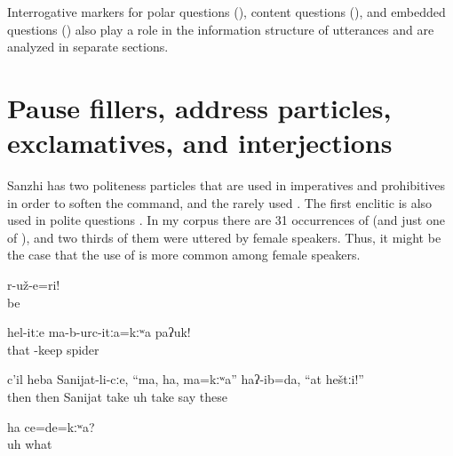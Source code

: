 Interrogative markers for polar questions (), content questions (), and embedded questions () also play a role in the information structure of utterances and are analyzed in separate sections.



\section{Pause fillers, address particles, exclamatives, and interjections}
\label{sec:Pause fillers, address particles, exclamatives, and interjections}

Sanzhi has two politeness particles that are used in imperatives and prohibitives in order to soften the command,  and the rarely used . The first enclitic is also used in polite questions . In my corpus there are 31 occurrences of  (and just one of ), and two thirds of them were uttered by female speakers. Thus, it might be the case that the use of  is more common among female speakers.
%
\begin{exe}
	\ex	\label{ex:‎‎‎Calm down minor}
	\gll	r-už-e=ri!\\
		be\\
	\glt	{}

	\ex	\label{ex:‎‎‎Do not keep the spider like this minor}
	\gll	hel-itːe	ma-b-urc-itːa=kːʷa	paʔuk!\\
		that	-keep	spider\\
	\glt	{}

	\ex	\label{ex:Then I said to Sanijat, hey, take, these are for you minor}
	\gll	c'il	heba	Sanijat-li-cːe,	``ma,	ha,	ma=kːʷa''	haʔ-ib=da,	``at	heštːi!''\\
		then	then	Sanijat	take	uh	take	say		these\\
	\glt	{}

	\ex	\label{ex:‎Uh, what was it (that I wanted to say) minor}
	\gll	ha	ce=de=kːʷa?\\
		uh	what\\
	\glt	{}
\end{exe}

